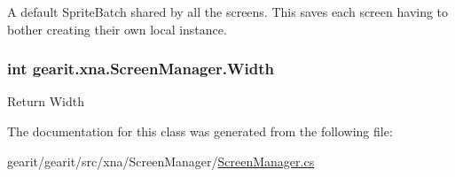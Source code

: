 A default Sprite\+Batch shared by all the screens. This saves each screen having to bother creating their own local instance. 

\hypertarget{classgearit_1_1xna_1_1_screen_manager_a439d024922ddd9906d16ed783167a4b5}{
\subsubsection[{Width}]{\setlength{\rightskip}{0pt plus 5cm}int gearit.\+xna.\+Screen\+Manager.\+Width\hspace{0.3cm}{\ttfamily [get]}}}\label{classgearit_1_1xna_1_1_screen_manager_a439d024922ddd9906d16ed783167a4b5}


Return Width 



The documentation for this class was generated from the following file\+:\begin{DoxyCompactItemize}
\item 
gearit/gearit/src/xna/\+Screen\+Manager/\hyperlink{_screen_manager_8cs}{Screen\+Manager.\+cs}\end{DoxyCompactItemize}
